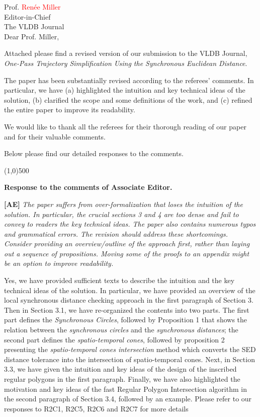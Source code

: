 \documentclass{letter}
\newcommand{\marked}[1]{\textcolor{red}{#1}}
\begin{document}
Prof. \marked{Renée Miller} \\
Editor-in-Chief		\\
The VLDB Journal	\\



Dear Prof. Miller,

Attached please find a revised version of our submission to
the VLDB Journal, \emph{One-Pass Trajectory Simplification Using the Synchronous Euclidean Distance}.


The paper has been substantially revised according to the referees' comments. In particular, we have {(a) highlighted the intuition and key technical ideas of the solution, (b) clarified the scope and some definitions of the work, and (c) refined the entire paper to improve its readability.}

We would like to thank all the referees for their thorough reading of our paper and for their valuable comments.

Below please find our detailed responses to the comments.


\line(1,0){500}

\textbf{Response to the comments of Associate Editor.}

\textbf{[AE]} \emph{The paper suffers from over-formalization that loses the intuition of the solution. In particular, the crucial sections 3 and 4 are too dense and fail to convey to readers the key technical ideas. The paper also contains numerous typos and grammatical errors. The revision should address these shortcomings. Consider providing an overview/outline of the approach first, rather than laying out a sequence of propositions. Moving some of the proofs to an appendix might be an option to improve readability. }

Yes, we have provided sufficient texts to describe the intuition and the key technical ideas of the solution. In particular, we have provided an overview of the local synchronous distance checking approach in the first paragraph of Section 3. Then in Section 3.1, we have re-organized the contents into two parts. The first part defines the \emph{Synchronous Circles}, followed by Proposition 1 that shows the relation between the \textit{synchronous circles} and the \textit{synchronous distances}; the second part defines the \textit{spatio-temporal cones}, followed by proposition 2 presenting the \textit{spatio-temporal cones intersection} method which converts the SED distance tolerance into the intersection of spatio-temporal cones.
Next, in Section 3.3, we have given the intuition and key ideas of the design of the inscribed regular polygons in the first paragraph. 
Finally, we have also highlighted the motivation and key ideas of the fast Regular Polygon Intersection algorithm in the second paragraph of Section 3.4, followed by an example. 
Please refer to our responses to R2C1, R2C5, R2C6 and R2C7 for more details
\end{document}
